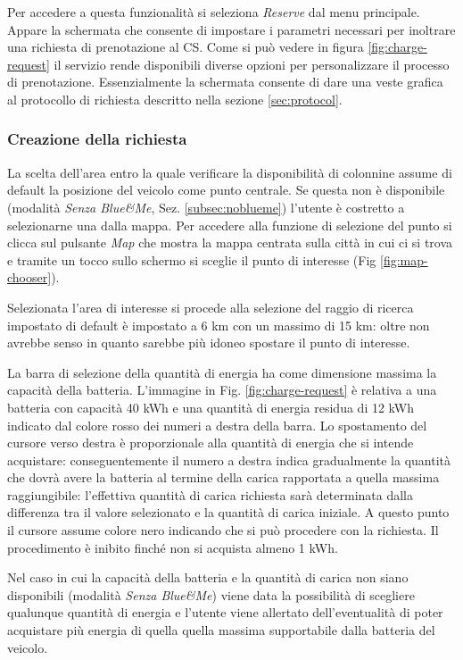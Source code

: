 Per accedere a questa funzionalità si seleziona \emph{Reserve} dal menu principale. Appare la schermata che consente di impostare i parametri necessari per inoltrare una richiesta di prenotazione al CS. Come si può vedere in figura \ref{fig:charge-request} il servizio rende disponibili diverse opzioni per personalizzare il processo di prenotazione. Essenzialmente la schermata consente di dare una veste grafica al protocollo di richiesta descritto nella sezione \ref{sec:protocol}.

\subsubsection{Creazione della richiesta}

La scelta dell'area entro la quale verificare la disponibilità di colonnine assume di default la posizione del veicolo come punto centrale. Se questa non è disponibile (modalità \emph{Senza Blue\&{}Me}, Sez. \ref{subsec:noblueme}) l'utente è costretto a selezionarne una dalla mappa. Per accedere alla funzione di selezione del punto si clicca sul pulsante \emph{Map} che mostra la mappa centrata sulla città in cui ci si trova e tramite un tocco sullo schermo si sceglie il punto di interesse (Fig \ref{fig:map-chooser}).

Selezionata l'area di interesse si procede alla selezione del raggio di ricerca impostato di default è impostato a 6 km con un massimo di 15 km: oltre non avrebbe senso in quanto sarebbe più idoneo spostare il punto di interesse.

La barra di selezione della quantità di energia ha come dimensione massima la capacità della batteria. L'immagine in Fig. \ref{fig:charge-request} è relativa a una batteria con capacità 40 kWh e una quantità di energia residua di 12 kWh indicato dal colore rosso dei numeri a destra della barra. Lo spostamento del cursore verso destra è proporzionale alla quantità di energia che si intende acquistare: conseguentemente il numero a destra indica gradualmente la quantità che dovrà avere la batteria al termine della carica rapportata a quella massima raggiungibile: l'effettiva quantità di carica richiesta sarà determinata dalla differenza tra il valore selezionato e la quantità di carica iniziale. A questo punto il cursore assume colore nero indicando che si può procedere con la richiesta. Il procedimento è inibito finché non si acquista almeno 1 kWh. 

Nel caso in cui la capacità della batteria e la quantità di carica non siano disponibili (modalità \emph{Senza Blue\&{}Me}) viene data la possibilità di scegliere qualunque quantità di energia e l'utente viene allertato dell'eventualità di poter acquistare più energia di quella quella massima supportabile dalla batteria del veicolo.

